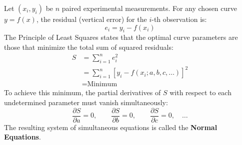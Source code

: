 \documentclass[12pt,a4paper]{article}
\begin{document}
\begin{tcolorbox}[defbox, title={\textbf{Definition: The Principle of Least Squares}}]
Let $(x_i, y_i)$ be $n$ paired experimental measurements. For any chosen curve $y = f(x)$, the residual (vertical error) for the $i$-th observation is:
\begin{equation}
  e_i = y_i - f(x_i)
\end{equation}
The Principle of Least Squares states that the optimal curve parameters are those that minimize the total sum of squared residuals:
\begin{equation}
  \begin{aligned}
    S &= \sum_{i=1}^n e_i^2 \\[3pt]
    &= \sum_{i=1}^n \left[y_i - f(x_i; a, b, c, \dots)\right]^2 \\[3pt]
    &= \text{Minimum}
  \end{aligned}
\end{equation}
To achieve this minimum, the partial derivatives of $S$ with respect to each undetermined parameter must vanish simultaneously:
\begin{equation}
  \frac{\partial S}{\partial a} = 0, \qquad \frac{\partial S}{\partial b} = 0, \qquad \frac{\partial S}{\partial c} = 0, \quad \dots
\end{equation}
The resulting system of simultaneous equations is called the \textbf{Normal Equations}.
\end{tcolorbox}
\end{document}
